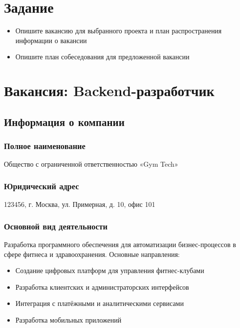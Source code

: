 \documentclass[14pt, russian]{matmex-diploma-custom}
\begin{document}

\maketitle

\section*{Задание}
\begin{itemize}
    \item Опишите вакансию для выбранного проекта и план распространения информации о вакансии
    \item Опишите план собеседования для предложенной вакансии
\end{itemize}


\section{Вакансия: Backend-разработчик}

\subsection{Информация о компании}

\subsubsection{Полное наименование}
Общество с ограниченной ответственностью «Gym Tech»

\subsubsection{Юридический адрес}
123456, г. Москва, ул. Примерная, д. 10, офис 101

\subsubsection{Основной вид деятельности}
Разработка программного обеспечения для автоматизации бизнес-процессов в сфере фитнеса и здравоохранения.
Основные направления:
\begin{itemize}
    \item Создание цифровых платформ для управления фитнес-клубами
    \item Разработка клиентских и администраторских интерфейсов
    \item Интеграция с платёжными и аналитическими сервисами
    \item Разработка мобильных приложений
\end{itemize}
\end{document}
